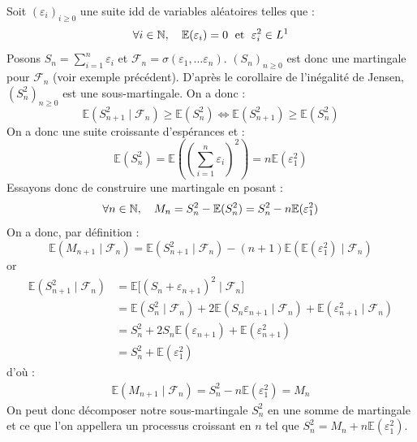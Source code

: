 \begin{example}
    Soit $( \varepsilon_i)_{i \geqslant 0}$ une suite idd de variables aléatoires telles que : 
        $$ \forall i \in \mathbb{N}, \quad \mathbb{E}( \varepsilon_i) = 0 \; \text{ et } \; \varepsilon_i^2 \in L^1 $$ 
    Posons $ S_n = \sum_{i=1}^{n} \varepsilon_i$ et $ \mathcal{F}_n = \sigma( \varepsilon_1, \dots \varepsilon_n)$. 
    $(S_n)_{n \geqslant 0}$ est donc une martingale pour $ \mathcal{F}_n$ (voir exemple précédent). D'après le 
    corollaire de l'inégalité de Jensen, $(S_n^2)_{n \geqslant 0}$ est une sous-martingale. On a donc : 
        $$ \mathbb{E}(S_{n+1}^2 \mid \mathcal{F}_n) \geqslant \mathbb{E}(S_n^2) \iff \mathbb{E}(S_{n+1}^2) \geqslant \mathbb{E}(S_n^2) $$ 
    On a donc une suite croissante d'espérances et : 
        $$ \mathbb{E}(S_n^2) = \mathbb{E} \left( \left(\sum_{i=1}^{n} \varepsilon_i\right)^2 \right) = n \mathbb{E}( \varepsilon_1 ^2) $$ 
    Essayons donc de construire une martingale en posant : 
        $$ \forall n \in \mathbb{N}, \quad M_n = S_n^2 - \mathbb{E}(S_n^2) = S_n^2 - n \mathbb{E}( \varepsilon_1^2) $$ 
    On a donc, par définition : 
        $$ \mathbb{E}(M_{n+1} \mid \mathcal{F}_n) = \mathbb{E}(S_{n+1}^2 \mid \mathcal{F}_n) - (n+1)\mathbb{E}( \mathbb{E} (\varepsilon_1^2) \mid \mathcal{F}_n) $$ 
    or  
        \begin{align*}
            \mathbb{E}(S_{n+1}^2 \mid \mathcal{F}_n) &= \mathbb{E}\big[ ( S_n + \varepsilon_{n+1})^2 \mid \mathcal{F}_n \big] \\ 
            &= \mathbb{E}(S_n^2 \mid \mathcal{F}_n) + 2\mathbb{E}(S_n \varepsilon_{n+1} \mid \mathcal{F}_n) + \mathbb{E}( \varepsilon_{n+1}^2 \mid \mathcal{F}_n) \\ 
            &= S_n^2 + 2 S_n \mathbb{E}( \varepsilon_{n+1}) + \mathbb{E}( \varepsilon_{n+1}^2) \\ 
            &= S_n^2 + \mathbb{E}( \varepsilon_1^2) 
        \end{align*}
    d'où : 
        \begin{align*}
            \mathbb{E}(M_{n+1} \mid \mathcal{F}_n) = S_n^2 - n \mathbb{E}( \varepsilon_1^2) = M_n 
        \end{align*}
    On peut donc décomposer notre sous-martingale $S_n^2$ en une somme de martingale et ce que l'on appellera 
    un processus croissant en $n$ tel que $ S_n^2 = M_n + n \mathbb{E}( \varepsilon_1^2) $.
\end{example}

